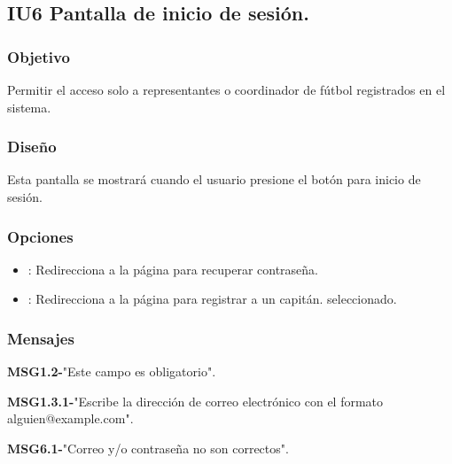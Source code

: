 \subsection{IU6 Pantalla de inicio de sesión.}

\subsubsection{Objetivo}
	Permitir el acceso solo a representantes o coordinador de fútbol registrados en el sistema.

\subsubsection{Diseño}
	Esta pantalla se mostrará cuando el usuario presione el botón para inicio de sesión.


\subsubsection{Opciones}
\begin{itemize}
	\item {}: Redirecciona a la página para recuperar contraseña.
	\item {}: Redirecciona a la página para registrar a un capitán. seleccionado.
\end{itemize}

\subsubsection{Mensajes}
	\begin{Citemize}
		\item {\bf MSG1.2-}"Este campo es obligatorio".
		\item {\bf MSG1.3.1-}"Escribe la dirección de correo electrónico con el formato alguien@example.com".
		\item {\bf MSG6.1-}"Correo y/o contraseña no son correctos".
	\end{Citemize}